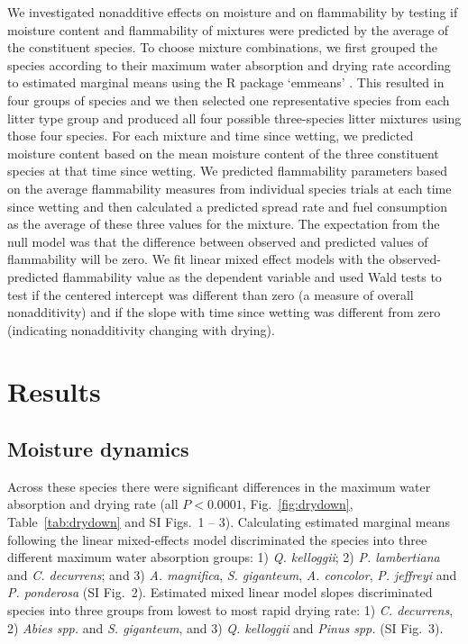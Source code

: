 \documentclass[letterpaper,12pt]{article}
\begin{document}
We investigated nonadditive effects on moisture and on flammability by
testing if moisture content and flammability of mixtures were predicted by the
average of the constituent species. To choose mixture combinations, we first
grouped the species according to their maximum water absorption and drying rate
according to estimated marginal means using the R package `emmeans'
\citep{Lenth-2019}. This resulted in four groups of species and we then
selected one representative species from each litter type group and produced
all four possible three-species litter mixtures using those four species. For
each mixture and time since wetting, we predicted moisture content based on the
mean moisture content of the three constituent species at that time since
wetting. We predicted flammability parameters based on the average flammability
measures from individual species trials at each time since wetting and then
calculated a predicted spread rate and fuel consumption as the average of these
three values for the mixture. The expectation from the null model was that the
difference between observed and predicted values of flammability will be zero.
We fit linear mixed effect models with the observed-predicted flammability
value as the dependent variable and used Wald tests to test if the centered
intercept was different than zero (a measure of overall nonadditivity) and if
the slope with time since wetting was different from zero (indicating
nonadditivity changing with drying).

\section*{Results}

\subsection*{Moisture dynamics}

Across these species there were significant differences in the maximum water
absorption and drying rate (all $P < 0.0001$, Fig.~\ref{fig:drydown},
Table~\ref{tab:drydown} and SI Figs.~1 -- 3). Calculating estimated marginal
means following the linear mixed-effects model discriminated the species into
three different maximum water absorption groups: 1) \emph{Q. kelloggii}; 2)
\emph{P. lambertiana} and \emph{C. decurrens}; and 3) \emph{A. magnifica},
\emph{S. giganteum}, \emph{A. concolor}, \emph{P. jeffreyi} and \emph{P.
  ponderosa} (SI Fig.~2). Estimated mixed linear model slopes discriminated
species into three groups from lowest to most rapid drying rate: 1) \emph{C.
  decurrens}, 2) \emph{Abies spp.} and \emph{S. giganteum}, and 3) \emph{Q.
  kelloggii} and \emph{Pinus spp.} (SI Fig.~3).
\end{document}
